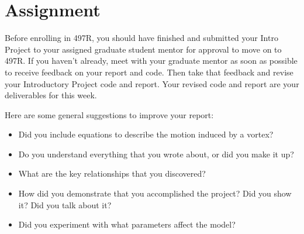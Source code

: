 \documentclass[12pt]{article}
\begin{document}
	


\section{Assignment}

Before enrolling in 497R, you should have finished and submitted your Intro Project to your assigned graduate student mentor for approval to move on to 497R.
If you haven't already, meet with your graduate mentor as soon as possible to receive feedback on your report and code.  Then take that feedback and revise your Introductory Project code and report.  Your revised code and report are your deliverables for this week.

\bigskip

Here are some general suggestions to improve your report:

\begin{itemize}
\item Did you include equations to describe the motion induced by a vortex? 
\item Do you understand everything that you wrote about, or did you make it up?
\item What are the key relationships that you discovered? 
\item How did you demonstrate that you accomplished the project? Did you show it? Did you talk about it?
\item Did you experiment with what parameters affect the model? 
\end{itemize}
\end{document}
